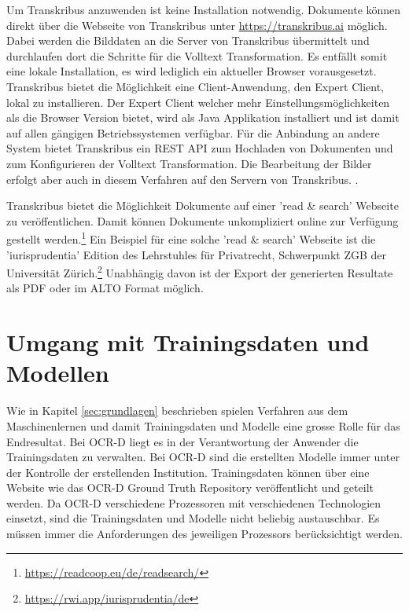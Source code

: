 \documentclass[a4paper,oneside, 12pt]{report}
\begin{document}
Um Transkribus anzuwenden ist keine Installation notwendig. Dokumente können direkt über die Webseite von Transkribus unter \url{https://transkribus.ai} möglich. Dabei werden die Bilddaten an die Server von Transkribus übermittelt und durchlaufen dort die Schritte für die Volltext Transformation. Es entfällt somit eine lokale Installation, es wird lediglich ein aktueller Browser vorausgesetzt. Transkribus bietet die Möglichkeit eine Client-Anwendung, den Expert Client, lokal zu installieren. Der Expert Client welcher mehr Einstellungsmöglichkeiten als die Browser Version bietet, wird als Java Applikation installiert und ist damit auf allen gängigen Betriebssystemen verfügbar. 
Für die Anbindung an andere System bietet Transkribus ein REST API zum Hochladen von Dokumenten und zum Konfigurieren der Volltext Transformation. Die Bearbeitung der Bilder erfolgt aber auch in diesem Verfahren auf den Servern von Transkribus. \cite{transkribusapi}. 

Transkribus bietet die Möglichkeit Dokumente auf einer 'read \& search' Webseite zu veröffentlichen. Damit können Dokumente unkompliziert online zur Verfügung gestellt werden.\footnote{\url{https://readcoop.eu/de/readsearch/}} Ein Beispiel für eine solche 'read \& search' Webseite ist die 'iurisprudentia' Edition des Lehrstuhles für Privatrecht, Schwerpunkt ZGB der Universität Zürich.\footnote{\url{https://rwi.app/iurisprudentia/de}}  Unabhängig davon ist der Export der generierten Resultate als PDF oder im ALTO Format möglich. \cite{transkribus}



\section{Umgang mit Trainingsdaten und Modellen}
Wie in Kapitel \ref{sec:grundlagen} beschrieben spielen Verfahren aus dem Maschinenlernen und damit Trainingsdaten und Modelle eine grosse Rolle für das Endresultat. Bei OCR-D liegt es in der Verantwortung der Anwender die Trainingsdaten zu verwalten. Bei OCR-D sind die erstellten Modelle immer unter der Kontrolle der erstellenden Institution. Trainingsdaten können über eine Website wie das OCR-D Ground Truth Repository veröffentlicht und geteilt werden. Da OCR-D verschiedene Prozessoren mit verschiedenen Technologien einsetzt, sind die Trainingsdaten und Modelle nicht beliebig austauschbar. Es müssen immer die Anforderungen des jeweiligen Prozessors berücksichtigt werden. \cite{ocrdgtrepo}
\end{document}
